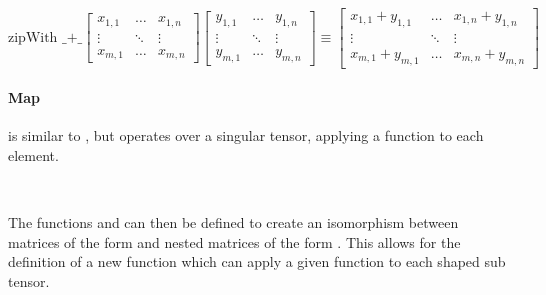 \begin{displaymath}
  \text{zipWith  \_+\_}
  \begin{bmatrix}
    x_{1,1} & \dots  & x_{1,n} \\
    \vdots  & \ddots & \vdots \\
    x_{m,1} & \dots  & x_{m,n}
  \end{bmatrix}
  \begin{bmatrix}
    y_{1,1} & \dots  & y_{1,n} \\
    \vdots  & \ddots & \vdots \\
    y_{m,1} & \dots  & y_{m,n}
  \end{bmatrix}
  \equiv 
  \begin{bmatrix}
    x_{1,1} + y_{1,1} & \dots  & x_{1,n} + y_{1,n} \\
    \vdots                  & \ddots & \vdots \\
    x_{m,1} + y_{m,1} & \dots  & x_{m,n} + y_{m,n}
  \end{bmatrix}
\end{displaymath}


\paragraph{Map} is similar to , but operates over a singular tensor, 
applying a function  to each element.
\begin{code}%
%
\>[2]\AgdaSpace{}%
\AgdaSymbol{:}\AgdaSpace{}%
\AgdaSymbol{(}\AgdaSpace{}%
\AgdaSymbol{:}\AgdaSpace{}%
\AgdaSpace{}%
\AgdaSpace{}%
\AgdaSymbol{)}\AgdaSpace{}%
\AgdaSpace{}%
\AgdaSpace{}%
\AgdaSpace{}%
\AgdaSpace{}%
\AgdaSpace{}%
\AgdaSpace{}%
\AgdaSpace{}%
\<%
\\
%
\>[2]\AgdaSpace{}%
\AgdaSpace{}%
\AgdaSpace{}%
\AgdaSpace{}%
\AgdaSymbol{=}\AgdaSpace{}%
\AgdaSpace{}%
\AgdaSymbol{(}\AgdaSpace{}%
\AgdaSymbol{)}\<%
\end{code}
The functions  and  can then be defined to create an 
isomorphism between matrices of the form  and nested matrices 
of the form .
This allows for the definition of a new function  which can apply a
given function to each  shaped sub tensor.

